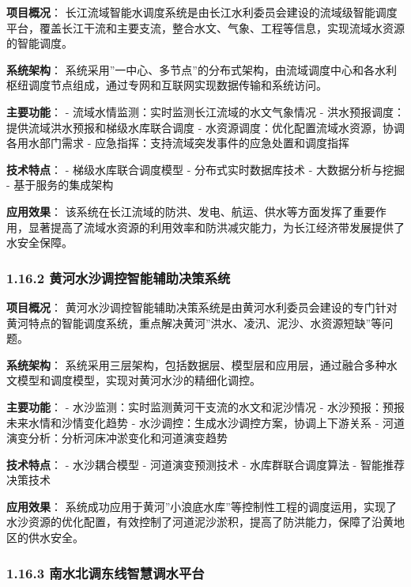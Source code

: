 \textbf{项目概况}：
长江流域智能水调度系统是由长江水利委员会建设的流域级智能调度平台，覆盖长江干流和主要支流，整合水文、气象、工程等信息，实现流域水资源的智能调度。

\textbf{系统架构}：
系统采用''一中心、多节点''的分布式架构，由流域调度中心和各水利枢纽调度节点组成，通过专网和互联网实现数据传输和系统访问。

\textbf{主要功能}： - 流域水情监测：实时监测长江流域的水文气象情况 -
洪水预报调度：提供流域洪水预报和梯级水库联合调度 -
水资源调度：优化配置流域水资源，协调各用水部门需求 -
应急指挥：支持流域突发事件的应急处置和调度指挥

\textbf{技术特点}： - 梯级水库联合调度模型 - 分布式实时数据库技术 -
大数据分析与挖掘 - 基于服务的集成架构

\textbf{应用效果}：
该系统在长江流域的防洪、发电、航运、供水等方面发挥了重要作用，显著提高了流域水资源的利用效率和防洪减灾能力，为长江经济带发展提供了水安全保障。

\subsubsection{1.16.2
黄河水沙调控智能辅助决策系统}\label{ux9ec4ux6cb3ux6c34ux6c99ux8c03ux63a7ux667aux80fdux8f85ux52a9ux51b3ux7b56ux7cfbux7edf}

\textbf{项目概况}：
黄河水沙调控智能辅助决策系统是由黄河水利委员会建设的专门针对黄河特点的智能调度系统，重点解决黄河''洪水、凌汛、泥沙、水资源短缺''等问题。

\textbf{系统架构}：
系统采用三层架构，包括数据层、模型层和应用层，通过融合多种水文模型和调度模型，实现对黄河水沙的精细化调控。

\textbf{主要功能}： - 水沙监测：实时监测黄河干支流的水文和泥沙情况 -
水沙预报：预报未来水情和沙情变化趋势 -
水沙调控：生成水沙调控方案，协调上下游关系 -
河道演变分析：分析河床冲淤变化和河道演变趋势

\textbf{技术特点}： - 水沙耦合模型 - 河道演变预测技术 -
水库群联合调度算法 - 智能推荐决策技术

\textbf{应用效果}：
系统成功应用于黄河''小浪底水库''等控制性工程的调度运用，实现了水沙资源的优化配置，有效控制了河道泥沙淤积，提高了防洪能力，保障了沿黄地区的供水安全。

\subsubsection{1.16.3
南水北调东线智慧调水平台}\label{ux5357ux6c34ux5317ux8c03ux4e1cux7ebfux667aux6167ux8c03ux6c34ux5e73ux53f0}

